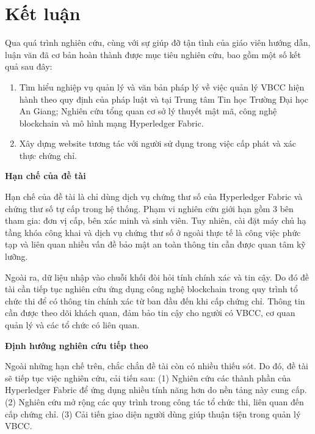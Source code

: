 \chapter{Kết luận}
Qua quá trình nghiên cứu, cùng với sự giúp đỡ tận tình của giáo viên hướng dẫn, luận văn đã cơ bản hoàn thành được mục tiêu nghiên cứu, bao gồm một số kết quả sau đây:

\begin{enumerate}

\item Tìm hiểu nghiệp vụ quản lý và văn bản pháp lý về việc quản lý VBCC hiện hành theo quy định của pháp luật và tại Trung tâm Tin học Trường Đại học An Giang; Nghiên cứu tổng quan cơ sở lý thuyết mật mã, công nghệ blockchain và mô hình mạng Hyperledger Fabric.

\item Xây dựng website tương tác với người sử dụng trong việc cấp phát và xác thực chứng chỉ.

\end{enumerate}

\textbf{Hạn chế của đề tài}

Hạn chế của đề tài là chỉ dùng dịch vụ chứng thư số của Hyperledger Fabric và chứng thư số tự cấp trong hệ thống. Phạm vi nghiên cứu giới hạn gồm 3 bên tham gia: đơn vị cấp, bên xác minh và sinh viên. Tuy nhiên, cài đặt máy chủ hạ tầng khóa công khai và dịch vụ chứng thư số ở ngoài thực tế là công việc phức tạp và liên quan nhiều vấn đề bảo mật an toàn thông tin cần được quan tâm kỹ lưỡng.

Ngoài ra, dữ liệu nhập vào chuỗi khối đòi hỏi tính chính xác và tin cậy. Do đó đề tài cần tiếp tục nghiên cứu ứng dụng công nghệ blockchain trong quy trình tổ chức thi để có thông tin chính xác từ ban đầu đến khi cấp chứng chỉ. Thông tin cần được theo dõi khách quan, đảm bảo tin cậy cho người có VBCC, cơ quan quản lý và các tổ chức có liên quan.

\textbf{Định hướng nghiên cứu tiếp theo}

Ngoài những hạn chế trên, chắc chắn đề tài còn có nhiều thiếu sót. Do đó, đề tài sẽ tiếp tục việc nghiên cứu, cải tiến sau: (1) Nghiên cứu các thành phần của Hyperledger Fabric để ứng dụng nhiều tính năng hơn do nền tảng này cung cấp. (2) Nghiên cứu mở rộng các quy trình trong công tác tổ chức thi, liên quan đến cấp chứng chỉ. (3) Cải tiến giao diện người dùng giúp thuận tiện trong quản lý VBCC.
